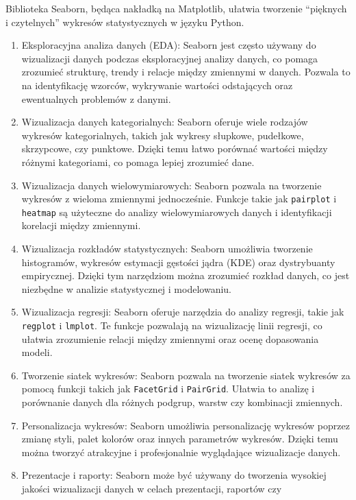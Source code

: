 \documentclass[
  polish,
  letterpaper,
  DIV=11,
  numbers=noendperiod]{scrreprt}
\begin{document}
Biblioteka Seaborn, będąca nakładką na Matplotlib, ułatwia tworzenie
``pięknych i czytelnych'' wykresów statystycznych w języku Python.

\begin{enumerate}
\def\labelenumi{\arabic{enumi}.}
\item
  Eksploracyjna analiza danych (EDA): Seaborn jest często używany do
  wizualizacji danych podczas eksploracyjnej analizy danych, co pomaga
  zrozumieć strukturę, trendy i relacje między zmiennymi w danych.
  Pozwala to na identyfikację wzorców, wykrywanie wartości odstających
  oraz ewentualnych problemów z danymi.
\item
  Wizualizacja danych kategorialnych: Seaborn oferuje wiele rodzajów
  wykresów kategorialnych, takich jak wykresy słupkowe, pudełkowe,
  skrzypcowe, czy punktowe. Dzięki temu łatwo porównać wartości między
  różnymi kategoriami, co pomaga lepiej zrozumieć dane.
\item
  Wizualizacja danych wielowymiarowych: Seaborn pozwala na tworzenie
  wykresów z wieloma zmiennymi jednocześnie. Funkcje takie jak
  \texttt{pairplot} i \texttt{heatmap} są użyteczne do analizy
  wielowymiarowych danych i identyfikacji korelacji między zmiennymi.
\item
  Wizualizacja rozkładów statystycznych: Seaborn umożliwia tworzenie
  histogramów, wykresów estymacji gęstości jądra (KDE) oraz dystrybuanty
  empirycznej. Dzięki tym narzędziom można zrozumieć rozkład danych, co
  jest niezbędne w analizie statystycznej i modelowaniu.
\item
  Wizualizacja regresji: Seaborn oferuje narzędzia do analizy regresji,
  takie jak \texttt{regplot} i \texttt{lmplot}. Te funkcje pozwalają na
  wizualizację linii regresji, co ułatwia zrozumienie relacji między
  zmiennymi oraz ocenę dopasowania modeli.
\item
  Tworzenie siatek wykresów: Seaborn pozwala na tworzenie siatek
  wykresów za pomocą funkcji takich jak \texttt{FacetGrid} i
  \texttt{PairGrid}. Ułatwia to analizę i porównanie danych dla różnych
  podgrup, warstw czy kombinacji zmiennych.
\item
  Personalizacja wykresów: Seaborn umożliwia personalizację wykresów
  poprzez zmianę styli, palet kolorów oraz innych parametrów wykresów.
  Dzięki temu można tworzyć atrakcyjne i profesjonalnie wyglądające
  wizualizacje danych.
\item
  Prezentacje i raporty: Seaborn może być używany do tworzenia wysokiej
  jakości wizualizacji danych w celach prezentacji, raportów czy

\end{enumerate}
\end{document}

